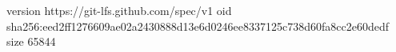 version https://git-lfs.github.com/spec/v1
oid sha256:eed2ff1276609ae02a2430888d13e6d0246ee8337125c738d60fa8cc2e60dedf
size 65844
